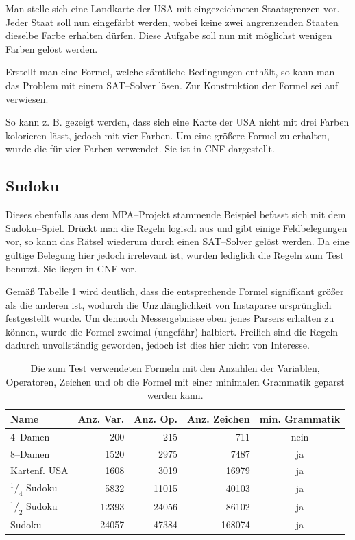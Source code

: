 \documentclass[ngerman,a4paper,abstracton,open=right,twoside=false,toc=listofnumbered,bibtotocnumbered]{scrreprt}
\begin{document}
Man stelle sich eine Landkarte der USA mit eingezeichneten Staatsgrenzen vor. Jeder Staat soll nun eingefärbt werden, wobei keine zwei angrenzenden Staaten dieselbe Farbe erhalten dürfen. Diese Aufgabe soll nun mit möglichst wenigen Farben gelöst werden.

Erstellt man eine Formel, welche sämtliche Bedingungen enthält, so kann man das Problem mit einem SAT--Solver lösen. Zur Konstruktion der Formel sei auf \cite{mpa-logeleien} verwiesen.

So kann z. B. gezeigt werden, dass sich eine Karte der USA nicht mit drei Farben kolorieren lässt, jedoch mit vier Farben. Um eine größere Formel zu erhalten, wurde die für vier Farben verwendet. Sie ist in CNF dargestellt.

\subsection{Sudoku}

Dieses ebenfalls aus dem MPA--Projekt stammende Beispiel befasst sich mit dem Sudoku--Spiel. Drückt man die Regeln logisch aus und gibt einige Feldbelegungen vor, so kann das Rätsel wiederum durch einen SAT--Solver gelöst werden. Da eine gültige Belegung hier jedoch irrelevant ist, wurden lediglich die Regeln zum Test benutzt. Sie liegen in CNF vor.

Gemäß Tabelle \ref{formeln-zahlen} wird deutlich, dass die entsprechende Formel signifikant größer als die anderen ist, wodurch die Unzulänglichkeit von Instaparse ursprünglich festgestellt wurde. Um dennoch Messergebnisse eben jenes Parsers erhalten zu können, wurde die Formel zweimal (ungefähr) halbiert. Freilich sind die Regeln dadurch unvollständig geworden, jedoch ist dies hier nicht von Interesse.

\begin{table}[h]
	\begin{tabular}{|l|r|r|r|c|}
		\hline
		\textbf{Name} & \textbf{Anz. Var.} & \textbf{Anz. Op.} & \textbf{Anz. Zeichen} & \textbf{min. Grammatik} \\ \hline
		4--Damen & 200 & 215 & 711 & nein \\ \hline
		8--Damen & 1520 & 2975 & 7487 & ja \\ \hline
		Kartenf. USA & 1608 & 3019 & 16979 & ja \\ \hline
		$^1/_4$ Sudoku & 5832 & 11015 & 40103 & ja \\ \hline
		$^1/_2$ Sudoku & 12393 & 24056 & 86102 & ja \\ \hline
		Sudoku & 24057 & 47384 & 168074 & ja \\ \hline
	\end{tabular}
	\caption{Die zum Test verwendeten Formeln mit den Anzahlen der Variablen, Operatoren, Zeichen und ob die Formel mit einer minimalen Grammatik geparst werden kann.}
	\label{formeln-zahlen}
\end{table}
\end{document}
